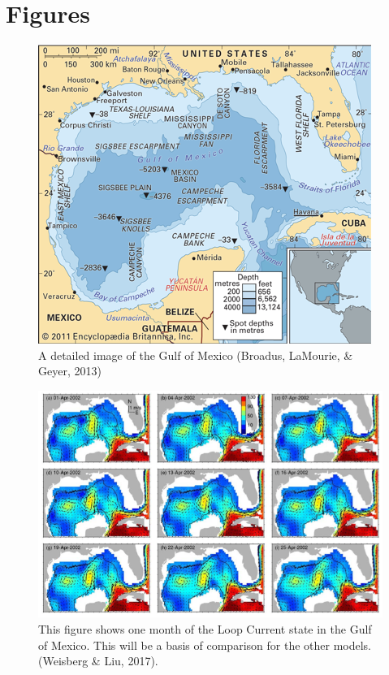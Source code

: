\documentclass{article}
\begin{document}
\section{Figures}

\begin{figure}
    \centering
    \includegraphics{Picture1.png}
    \caption{A detailed image of the Gulf of Mexico (Broadus, LaMourie, & Geyer, 2013)}
    \label{fig:my_label}
\end{figure}

\begin{figure}
    \centering
    \includegraphics{Picture2.png}
    \caption{This figure shows one month of the Loop Current state in the Gulf of Mexico. This will be a basis of comparison for the other models. (Weisberg & Liu, 2017).}
    \label{fig:my_label}
\end{figure}
\end{document}
